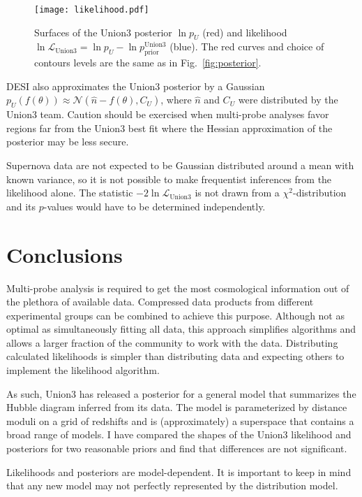 \documentclass{aastex631}
\begin{document}
\begin{figure}[htbp] %
   \centering
   \texttt{[image: likelihood.pdf]} 
   \caption{Surfaces of the Union3 posterior $\ln{p_U}$ (red) and likelihood $\ln{\mathcal{L}_\text{Union3}}  = \ln{p_U}-\ln{p_\text{prior}^\text{Union3}}$ (blue).   The red curves
   and choice of contours levels are the same as in Fig.~\ref{fig:posterior}.\label{fig:likelihood}}
\end{figure}

DESI also approximates the Union3 posterior by a Gaussian ${p_U(f(\theta))} \approx \mathcal{N}( \hat{n}-f(\theta) , C_U)$,
where $\hat{n}$ and $C_U$ were distributed by the Union3 team.
Caution should be exercised when multi-probe analyses favor regions far from the Union3 best fit  where the Hessian approximation of the
posterior may be less secure.

Supernova data are not expected to be Gaussian distributed around a mean with known variance, so it is not possible
to make frequentist inferences from the likelihood alone.  The statistic
$-2\ln{\mathcal{L}_\text{Union3}}$  is not drawn from a $\chi^2$-distribution and its $p$-values would have to be determined
independently.

\section{Conclusions}
\label{sec:conclusions}
Multi-probe  analysis is required to get the most cosmological information out of the plethora of available data. 
Compressed data products from different experimental groups can be combined to achieve this purpose.
Although not as optimal as simultaneously fitting all data, this approach simplifies algorithms and allows a larger
fraction of
the community to work with the data.  Distributing calculated likelihoods is simpler than distributing data and expecting others to implement the likelihood algorithm.

As such, Union3 has released a posterior for a general model that summarizes the Hubble diagram inferred from its data.
The model is parameterized by distance moduli on a grid of redshifts and is (approximately) a superspace that
contains a broad range of models.    I have compared the shapes of the Union3 likelihood and posteriors for two
reasonable priors and find that differences are not significant.

Likelihoods and posteriors are model-dependent.  It is important to keep in mind that any new model may not perfectly represented by the 
distribution model.
\end{document}
